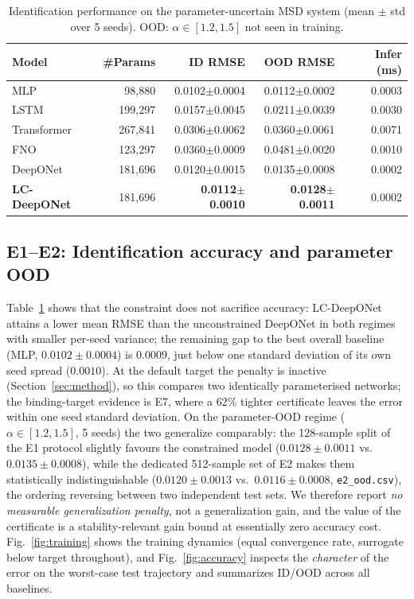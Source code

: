 \documentclass[11pt]{article}
\begin{document}
\begin{table}[t]
\centering\small
\caption{Identification performance on the parameter-uncertain MSD system
(mean $\pm$ std over 5 seeds). OOD: $\alpha\in[1.2,1.5]$ not seen in training.}
\label{tab:e1}
\begin{tabular}{lrrrr}
\toprule
Model & \#Params & ID RMSE & OOD RMSE & Infer (ms) \\
\midrule
MLP          & 98{,}880  & 0.0102$\pm$0.0004 & 0.0112$\pm$0.0002 & 0.0003 \\
LSTM         & 199{,}297 & 0.0157$\pm$0.0045 & 0.0211$\pm$0.0039 & 0.0030 \\
Transformer  & 267{,}841 & 0.0306$\pm$0.0062 & 0.0360$\pm$0.0061 & 0.0071 \\
FNO          & 123{,}297 & 0.0360$\pm$0.0009 & 0.0481$\pm$0.0020 & 0.0010 \\
DeepONet     & 181{,}696 & 0.0120$\pm$0.0015 & 0.0135$\pm$0.0008 & 0.0002 \\
\textbf{LC-DeepONet} & 181{,}696 & \textbf{0.0112$\pm$0.0010} & \textbf{0.0128$\pm$0.0011} & 0.0002 \\
\bottomrule
\end{tabular}
\end{table}

\subsection{E1--E2: Identification accuracy and parameter OOD}
Table~\ref{tab:e1} shows that the constraint does not sacrifice accuracy:
LC-DeepONet attains a lower mean RMSE than the unconstrained DeepONet in both
regimes with smaller per-seed variance; the remaining gap to the best
overall baseline (MLP, $0.0102\pm0.0004$) is $0.0009$, just below one standard
deviation of its own seed spread ($0.0010$). At the
default target the penalty is inactive (Section~\ref{sec:method}), so this
compares two identically parameterised networks; the binding-target evidence
is E7, where a $62\%$ tighter certificate leaves the error within one seed
standard deviation. On the parameter-OOD regime ($\alpha\in[1.2,1.5]$, 5 seeds) the two generalize
comparably: the 128-sample split of the E1 protocol slightly favours the
constrained model ($0.0128\pm0.0011$ vs.\ $0.0135\pm0.0008$), while the
dedicated 512-sample set of E2 makes them statistically indistinguishable
($0.0120\pm0.0013$ vs.\ $0.0116\pm0.0008$, \texttt{e2\_ood.csv}), the ordering
reversing between two independent test sets. We therefore report
\emph{no measurable generalization penalty}, not a generalization gain, and
the value of the certificate is a stability-relevant gain bound at essentially
zero accuracy cost. Fig.~\ref{fig:training} shows the training dynamics (equal
convergence rate, surrogate below target throughout), and
Fig.~\ref{fig:accuracy} inspects the \emph{character} of the error on the
worst-case test trajectory and summarizes ID/OOD across all baselines.
\end{document}
